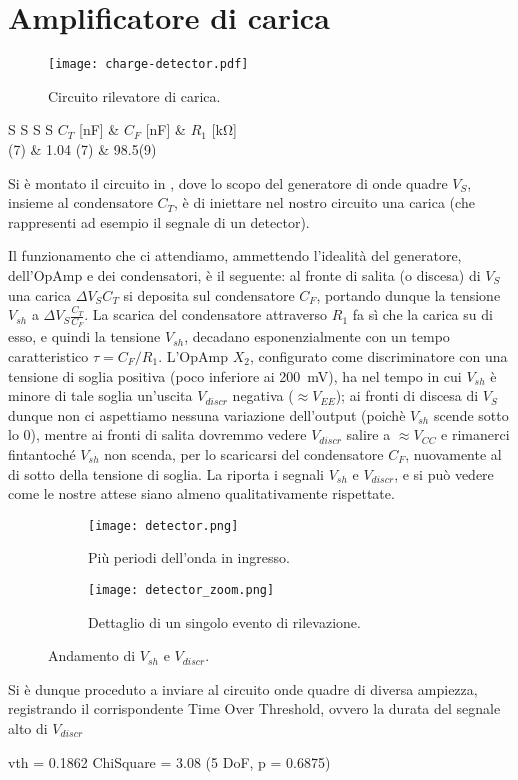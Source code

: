 \section{Amplificatore di carica}

\begin{figure}[h]
	\centering
	\texttt{[image: charge-detector.pdf]}
	\caption{Circuito rilevatore di carica.}
	\label{f:circ_detq}
\end{figure}

\begin{table}[h]
	\centering
	\begin{tabular}{S S S S}
		{$C_T$ [\si{\nano\farad}]} & {$C_F$ [\si{\nano\farad}]} & {$R_1$ [\si{\kohm}]} \\
		(7)	&	1.04 (7)	&	98.5(9) \\
	\end{tabular}
	\caption{Valori misurati per i componenti del circuito.}
	\label{t:det_meas}
\end{table}

Si è montato il circuito in , dove lo scopo del generatore di onde quadre $V_S$, insieme al condensatore $C_T$, è di iniettare nel nostro circuito una carica (che rappresenti ad esempio il segnale di un detector).

Il funzionamento che ci attendiamo, ammettendo l'idealità del generatore, dell'OpAmp e dei condensatori, è il seguente: al fronte di salita (o discesa) di $V_S$ una carica $\Delta V_S C_T$ si deposita sul condensatore $C_F$, portando dunque la tensione $V_{sh}$ a $\Delta V_S \frac{C_T}{C_F}$. La scarica del condensatore attraverso $R_1$ fa sì che la carica su di esso, e quindi la tensione $V_{sh}$, decadano esponenzialmente con un tempo caratteristico $\tau = C_F / R_1$. L'OpAmp $X_2$, configurato come discriminatore con una tensione di soglia positiva (poco inferiore ai \SI{200}{\mV}), ha nel tempo in cui $V_{sh}$ è minore di tale soglia un'uscita $V_{discr}$ negativa ($\approx V_{EE}$); ai fronti di discesa di $V_S$ dunque non ci aspettiamo nessuna variazione dell'output (poichè $V_{sh}$ scende sotto lo 0), mentre ai fronti di salita dovremmo vedere $V_{discr}$ salire a $\approx V_{CC}$ e rimanerci fintantoché $V_{sh}$ non scenda, per lo scaricarsi del condensatore $C_F$, nuovamente al di sotto della tensione di soglia. La  riporta i segnali $V_{sh}$ e $V_{discr}$, e si può vedere come le nostre attese siano almeno qualitativamente rispettate.

\begin{figure}[h]
	\begin{subfigure}{0.5 \textwidth}
		\centering
		\texttt{[image: detector.png]}
		\caption{Più periodi dell'onda in ingresso.}
	\end{subfigure}
	\begin{subfigure}{0.5 \textwidth}
		\centering
		\texttt{[image: detector\_zoom.png]}
		\caption{Dettaglio di un singolo evento di rilevazione.}
	\end{subfigure}
	\caption{Andamento di $V_{sh}$ e $V_{discr}$.}
	\label{f:det_norm}
\end{figure}

Si è dunque proceduto a inviare al circuito onde quadre di diversa ampiezza, registrando il corrispondente Time Over Threshold, ovvero la durata del segnale alto di $V_{discr}$

vth = 0.1862 
ChiSquare = 3.08 (5 DoF, p = 0.6875)
